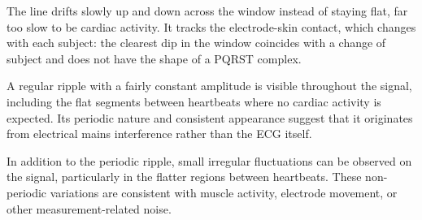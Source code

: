 \documentclass[11pt,a4paper]{article}
\newcommand{\hertz}{Hz}
\newcommand{\percent}{\%}
\newcommand{\uV}{\ensuremath{\mu}V}
\newcommand{\num}[1]{#1}
\newcommand{\SI}[2]{#1\,#2}
\begin{document}
\begin{description}[leftmargin=1.6em,style=nextline]

\item[Baseline wander.] The line drifts slowly up and down across the window instead
of staying flat, far too slow to be cardiac activity. It tracks the electrode-skin contact,
which changes with each subject: the clearest dip in the window coincides with a change of
subject and does not have the shape of a PQRST complex.

\item[Powerline interference.] A regular ripple with a fairly constant amplitude is visible throughout the signal, including the flat segments between heartbeats where no cardiac activity is expected. Its periodic nature and consistent appearance suggest that it originates from electrical mains interference rather than the ECG itself.

\item[Broadband muscle and contact noise.] In addition to the periodic ripple, small irregular fluctuations can be observed on the signal, particularly in the flatter regions between heartbeats. These non-periodic variations are consistent with muscle activity, electrode movement, or other measurement-related noise.

%
\end{description}

%
%
\end{document}
